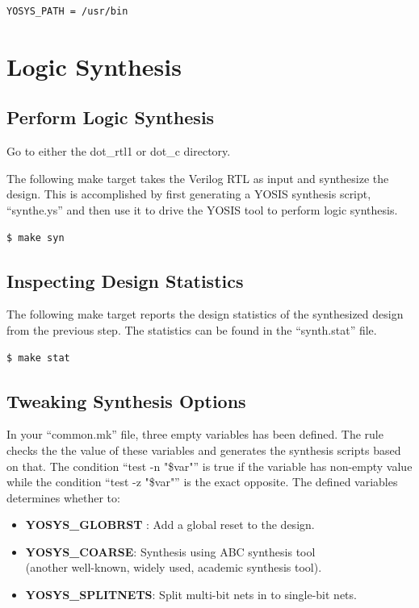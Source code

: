 \documentclass[12pt]{article}
\newcommand{\quotes}[1]{``#1''}
\begin{document}
\begin{lstlisting}[language=bash]
YOSYS_PATH = /usr/bin
\end{lstlisting}

\section{Logic Synthesis}

\subsection{Perform Logic Synthesis}

Go to either the dot\_rtl1 or dot_c directory. 

The following make target takes the Verilog RTL as input and synthesize
the design. This is accomplished by first generating a YOSIS synthesis
script, \quotes{synthe.ys} and then use it to drive the YOSIS tool to
perform logic synthesis.

\begin{lstlisting}[language=bash]
  $ make syn
\end{lstlisting}

\subsection{Inspecting Design Statistics}

The following make target reports the design statistics of the
synthesized design from the previous step. The statistics can be found
in the \quotes{synth.stat} file.

\begin{lstlisting}[language=bash]
  $ make stat
\end{lstlisting}

\subsection{Tweaking Synthesis Options}

In your \quotes{common.mk} file, three empty variables has been
defined. The rule checks the the value of these variables and
generates the synthesis scripts based on that. The condition
\quotes{test -n "\$var"} is true if the variable has non-empty value
while the condition \quotes{test -z "\$var"} is the exact
opposite. The defined variables determines whether to:

\begin{itemize}
\item \textbf{YOSYS\_GLOBRST} : Add a global reset to the design.
\item \textbf{YOSYS\_COARSE}: Synthesis using ABC synthesis tool\\(another well-known, widely used, academic synthesis tool).
\item \textbf{YOSYS\_SPLITNETS}: Split multi-bit nets in to single-bit nets.
\end{itemize}
\end{document}
